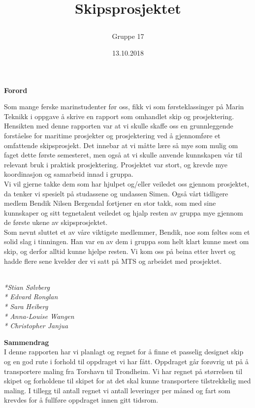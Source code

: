 \documentclass[norsk]{article}
\begin{document}
\title{Skipsprosjektet
\author{Gruppe 17}}
\date{13.10.2018}


 
 
\begin{center}
{\Large \textbf{Forord}}
\end{center}


Som mange ferske marinstudenter før oss, fikk vi som førsteklassinger på Marin Teknikk i oppgave å skrive en rapport som omhandlet skip og prosjektering. Hensikten med denne rapporten var at vi skulle skaffe oss en grunnleggende forståelse for maritime prosjekter og prosjektering ved å gjennomføre et omfattende skipsprosjekt. Det innebar at vi måtte lære så mye som mulig om faget dette første semesteret, men også at vi skulle anvende kunnskapen vår til relevant bruk i praktisk prosjektering. Prosjektet var stort, og krevde mye koordinasjon og samarbeid innad i gruppa. \\

Vi vil gjerne takke dem som har hjulpet og/eller veiledet oss gjennom prosjektet, da tenker vi spesielt på studassene og undassen Simen. Også vårt tidligere medlem Bendik Nilsen Bergendal fortjener en stor takk, som med sine kunnskaper og sitt tegnetalent veiledet og hjalp resten av gruppa mye gjennom de første ukene av skipsprosjektet. \\

Som nevnt sluttet et av våre viktigste medlemmer, Bendik, noe som føltes som et solid slag i tinningen. Han var en av dem i gruppa som helt klart kunne mest om skip, og derfor alltid kunne hjelpe resten. Vi kom oss på beina etter hvert og hadde flere sene kvelder der vi satt på MTS og arbeidet med prosjektet. 

\textit{\\*Stian Sølvberg \\* Edvard Ronglan \\* Sara Heiberg \\* Anna-Louise Wangen \\* Christopher Janjua} \pagebreak 



{\Large \textbf{Sammendrag} }\\
	
	I denne rapporten har vi planlagt og regnet for å finne et passelig designet skip og en god rute i forhold til oppdraget vi har fått. Oppdraget går forøvrig ut på å transportere maling fra Torshavn til Trondheim. Vi har regnet på størrelsen til skipet og forholdene til skipet for at det skal kunne transportere tilstrekkelig med maling. I tillegg til antall regnet vi antall leveringer per måned og fart som krevdes for å fullføre oppdraget innen gitt tidsrom. \\
\end{document}
